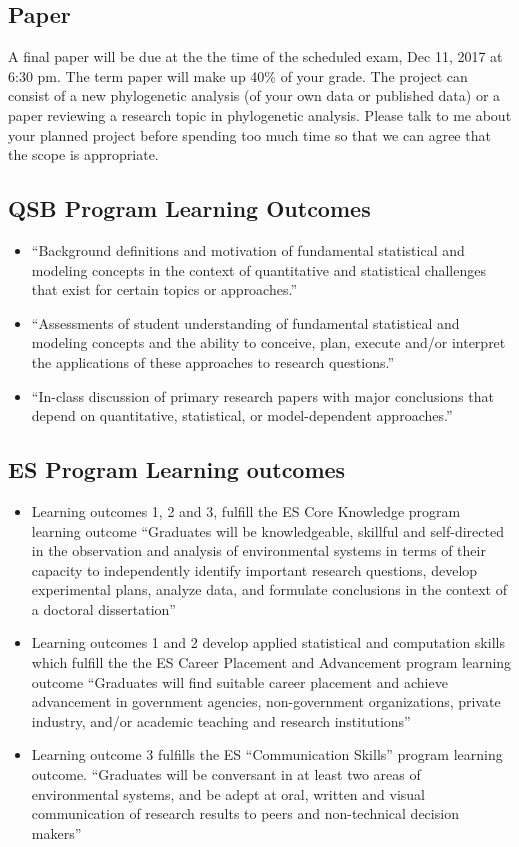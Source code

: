 \documentclass{article}
\begin{document}
{\subsection*{Paper}
A final paper will be due at the the time of the scheduled exam, Dec 11, 2017 at 6:30 pm.
The term paper will make up 40\% of your grade. The project can consist of a new
phylogenetic analysis (of your own data or published data) or a paper reviewing a research topic
in phylogenetic analysis. Please talk to me about your planned project before spending too much
time so that we can agree that the scope is appropriate.


\subsection*{QSB Program Learning Outcomes}
\begin{itemize}
 \item  ``Background definitions and motivation of fundamental statistical and modeling concepts in the context of quantitative and statistical challenges that exist for certain topics or approaches.''
 \item ``Assessments of student understanding of fundamental statistical and modeling concepts and the ability to conceive, plan, execute and/or interpret the applications of these approaches to research questions.''
 \item ``In-class discussion of primary research papers with major conclusions that depend on quantitative, statistical, or model-dependent approaches.''
\end{itemize}


\subsection*{ES Program Learning outcomes}
\begin{itemize}
 \item Learning outcomes 1, 2 and 3, fulfill the ES Core Knowledge program learning outcome ``Graduates will be knowledgeable, skillful and self-directed in the observation and analysis of environmental systems in terms of their capacity to independently identify important research questions, develop experimental plans, analyze data, and formulate conclusions in the context of a doctoral dissertation''
 \item Learning outcomes 1 and 2 develop applied statistical and computation skills which fulfill the the ES Career Placement and Advancement program learning outcome ``Graduates will find suitable career placement and achieve advancement in government agencies, non-government organizations, private industry, and/or academic teaching and research institutions''
 \item Learning outcome 3 fulfills the ES ``Communication Skills'' program learning outcome. ``Graduates will be conversant in at least two areas of environmental systems, and be adept at oral, written and visual communication of research results to peers and non-technical decision makers''
\end{itemize}


}
\end{document}
